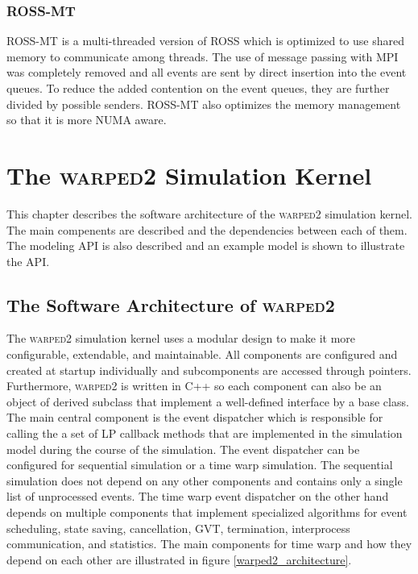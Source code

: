 \documentclass[11pt]{book}
\begin{document}
\subsection{ROSS-MT}

ROSS-MT\cite{jagtap-12} is a multi-threaded version of ROSS which is optimized to use shared
memory to communicate among threads. The use of message passing with MPI was completely
removed and all events are sent by direct insertion into the event queues. To reduce the
added contention on the event queues, they are further divided by possible senders. ROSS-MT
also optimizes the memory management so that it is more NUMA aware.



\chapter[\textsc{warped2}]{The \textsc{warped2} Simulation Kernel}\label{warped2_overview}

This chapter describes the software architecture of the \textsc{warped2} simulation kernel.
The main compenents are described and the dependencies between each of them. The modeling API
is also described and an example model is shown to illustrate the API.

\section{The Software Architecture of \textsc{warped2}}

The \textsc{warped2} simulation kernel uses a modular design to make it more configurable,
extendable, and maintainable. All components are configured and created at startup individually
and subcomponents are accessed through pointers. Furthermore, \textsc{warped2} is written in
C++ so each component can also be an object of derived subclass that implement a well-defined
interface by a base class. The main central component is the event dispatcher which is responsible
for calling the a set of LP callback methods that are implemented in the simulation model during
the course of the simulation. The event dispatcher can be configured for sequential simulation
or a time warp simulation. The sequential simulation does not depend on any other components and
contains only a single list of unprocessed events. The time warp event dispatcher on the other
hand depends on multiple components that implement specialized algorithms for event scheduling,
state saving, cancellation, GVT, termination, interprocess communication, and statistics. The
main components for time warp and how they depend on each other are illustrated in figure
\ref{warped2_architecture}.
\end{document}
